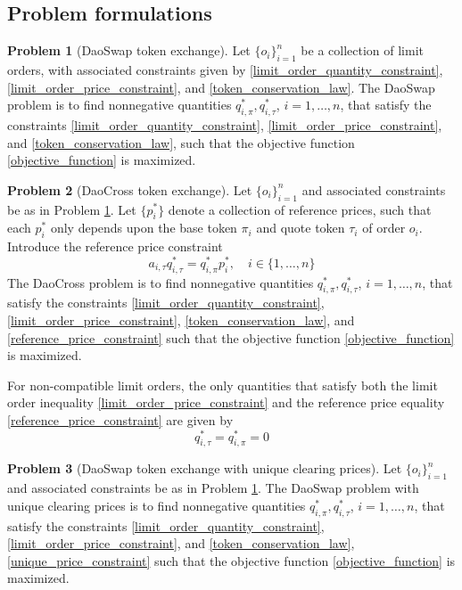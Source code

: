 \documentclass[11pt, reqno]{amsart}
\theoremstyle{definition}
\newtheorem{problem}{Problem}[subsection]
\theoremstyle{remark}
\begin{document}
\subsection{Problem formulations}

\begin{problem}[DaoSwap token exchange]\label{problem_daoswap}
Let $\{o_i\}_{i = 1}^n$ be a collection of limit orders, with associated
constraints given by \eqref{limit_order_quantity_constraint},
\eqref{limit_order_price_constraint}, and \eqref{token_conservation_law}.
The DaoSwap problem is to find nonnegative quantities
$q_{i, \pi}^*, q_{i, \tau}^*$, $i = 1, \ldots, n$, that satisfy the constraints
\eqref{limit_order_quantity_constraint},
\eqref{limit_order_price_constraint}, and \eqref{token_conservation_law},
such that the objective function \eqref{objective_function} is maximized.
\end{problem}

\begin{problem}[DaoCross token exchange]\label{problem_daocross}
Let $\{o_i\}_{i = 1}^n$ and associated constraints be as in Problem
\ref{problem_daoswap}.
Let $\{p_i^*\}$ denote a collection of reference prices, such that
each $p_i^*$ only depends upon the base token $\pi_i$ and quote
token $\tau_i$ of order $o_i$.
Introduce the reference price constraint
\begin{equation}\label{reference_price_constraint}
    a_{i, \tau} q_{i, \tau}^* = q_{i, \pi}^* p_i^*, \quad i \in \{1, \ldots, n\}
\end{equation}
The DaoCross problem is to find nonnegative quantities
$q_{i, \pi}^*, q_{i, \tau}^*$, $i = 1, \ldots, n$, that satisfy the constraints
\eqref{limit_order_quantity_constraint},
\eqref{limit_order_price_constraint}, \eqref{token_conservation_law},
and
\eqref{reference_price_constraint}
such that the objective function \eqref{objective_function} is maximized.
\end{problem}
For non-compatible limit orders, the only quantities that satisfy both the
limit order inequality \eqref{limit_order_price_constraint} and the reference
price equality \eqref{reference_price_constraint} are given by
\[
    q_{i, \tau}^* = q_{i, \pi}^* = 0
\]

\begin{problem}[DaoSwap token exchange with unique clearing prices]
\label{problem_daoswap_with_unique_prices}
Let $\{o_i\}_{i = 1}^n$ and associated constraints be as in Problem
\ref{problem_daoswap}.
The DaoSwap problem with unique clearing prices is to find nonnegative
quantities $q_{i, \pi}^*, q_{i, \tau}^*$, $i = 1, \ldots, n$, that satisfy the
constraints \eqref{limit_order_quantity_constraint},
\eqref{limit_order_price_constraint}, and \eqref{token_conservation_law},
\eqref{unique_price_constraint}
such that the objective function \eqref{objective_function} is maximized.
\end{problem}
\end{document}
